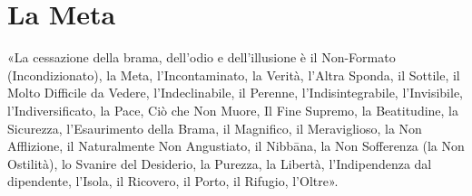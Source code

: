 
\section*{La Meta}

«La cessazione della brama, dell’odio e dell’illusione è il Non-Formato
(Incondizionato), la Meta, l’Incontaminato, la Verità, l’Altra Sponda, il
Sottile, il Molto Difficile da Vedere, l’Indeclinabile, il Perenne,
l’Indisintegrabile, l’Invisibile, l’Indiversificato, la Pace, Ciò che Non Muore,
Il Fine Supremo, la Beatitudine, la Sicurezza, l’Esaurimento della Brama, il
Magnifico, il Meraviglioso, la Non Afflizione, il Naturalmente Non Angustiato,
il Nibbāna, la Non Sofferenza (la Non Ostilità), lo Svanire del Desiderio, la
Purezza, la Libertà, l’Indipendenza dal dipendente, l’Isola, il Ricovero, il
Porto, il Rifugio, l’Oltre».


